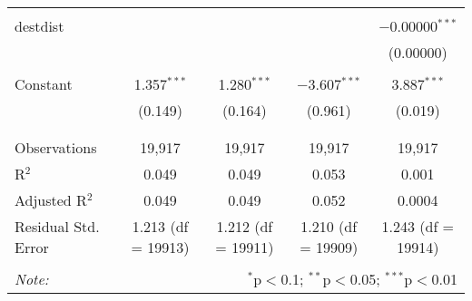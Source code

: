 \begin{table}[!htbp]
\begin{tabular}{@{\extracolsep{5pt}}lcccc}
  & & & & \\ 
 destdist &  &  &  & $-$0.00000$^{***}$ \\ 
  &  &  &  & (0.00000) \\ 
  & & & & \\ 
 Constant & 1.357$^{***}$ & 1.280$^{***}$ & $-$3.607$^{***}$ & 3.887$^{***}$ \\ 
  & (0.149) & (0.164) & (0.961) & (0.019) \\ 
  & & & & \\ 
\hline \\[-1.8ex] 
Observations & 19,917 & 19,917 & 19,917 & 19,917 \\ 
R$^{2}$ & 0.049 & 0.049 & 0.053 & 0.001 \\ 
Adjusted R$^{2}$ & 0.049 & 0.049 & 0.052 & 0.0004 \\ 
Residual Std. Error & 1.213 (df = 19913) & 1.212 (df = 19911) & 1.210 (df = 19909) & 1.243 (df = 19914) \\ 
\hline 
\hline \\[-1.8ex] 
\textit{Note:}  & \multicolumn{4}{r}{$^{*}$p$<$0.1; $^{**}$p$<$0.05; $^{***}$p$<$0.01} \\ 
\end{tabular} 
\end{table} 
